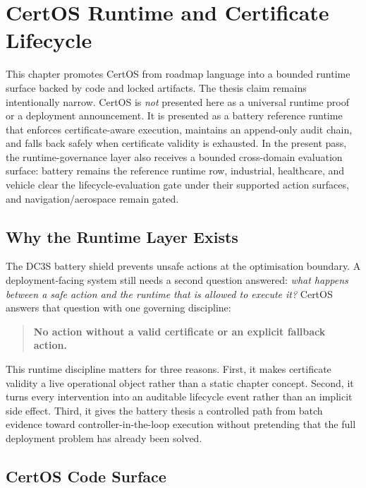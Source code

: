 \chapter{CertOS Runtime and Certificate Lifecycle}
\label{ch:certos-runtime}

This chapter promotes CertOS from roadmap language into a bounded runtime
surface backed by code and locked artifacts.  The thesis claim remains
intentionally narrow.  CertOS is \emph{not} presented here as a universal
runtime proof or a deployment announcement.  It is presented as a battery
reference runtime that enforces certificate-aware execution, maintains an
append-only audit chain, and falls back safely when certificate validity is
exhausted.  In the present pass, the runtime-governance layer also receives a bounded
cross-domain evaluation surface: battery remains the reference runtime row,
industrial, healthcare, and vehicle clear the lifecycle-evaluation gate under
their supported action surfaces, and navigation/aerospace remain gated.

\section{Why the Runtime Layer Exists}

The DC3S battery shield prevents unsafe actions at the optimisation
boundary.  A deployment-facing system still needs a second question
answered: \emph{what happens between a safe action and the runtime that is
allowed to execute it?}  CertOS answers that question with one governing
discipline:

\begin{quote}
\textbf{No action without a valid certificate or an explicit fallback
action.}
\end{quote}

This runtime discipline matters for three reasons.  First, it makes
certificate validity a live operational object rather than a static chapter
concept.  Second, it turns every intervention into an auditable lifecycle
event rather than an implicit side effect.  Third, it gives the battery
thesis a controlled path from batch evidence toward controller-in-the-loop
execution without pretending that the full deployment problem has already
been solved.

\section{CertOS Code Surface}

